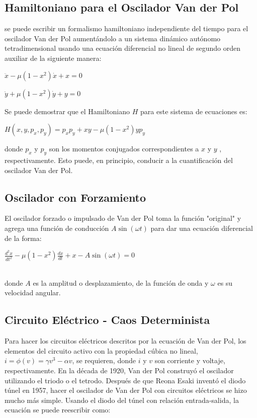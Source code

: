 \documentclass[12pt]{article}
\begin{document}
\subsection*{Hamiltoniano para el Oscilador Van der Pol}
se puede escribir un formalismo hamiltoniano independiente del tiempo para el oscilador Van der Pol aumentándolo a un sistema dinámico autónomo tetradimensional usando una ecuación diferencial no lineal de segundo orden auxiliar de la siguiente manera:\\
\centerline{$\displaystyle \ddot x - \mu (1-x^2)\dot x+x=0 $}
\centerline{$\displaystyle \ddot y + \mu (1-x^2)\dot y+y=0 $}
Se puede demostrar que el Hamiltoniano $H$ para este sistema de ecuaciones es:\\
\centerline{$ H(x,y,p_x,p_y) = p_x p_y +xy -\mu (1-x^2)yp_y$}
donde $p_x$ y $p_y$ son los momentos conjugados correspondientes a $x$ y $y$ , respectivamente. Esto puede, en principio, conducir a la cuantificación del oscilador Van der Pol.

\subsection*{Oscilador con Forzamiento}
El oscilador forzado o impulsado de Van der Pol toma la función "original" y agrega una función de conducción $A \sin ( \omega t )$ para dar una ecuación diferencial de la forma:\\

\centerline{$\displaystyle \frac{d^2x}{dt^2} - \mu (1-x^2) \frac{dx}{dt} +x-A \sin ( \omega t )  = 0$}
$ $\\
donde $A$ es la amplitud  o desplazamiento, de la función de onda y $\omega$ es su velocidad angular.

\subsection*{Circuito Eléctrico - Caos Determinista}
Para hacer los circuitos eléctricos descritos por la ecuación de Van der Pol, los elementos del circuito activo con la propiedad cúbica no lineal, $i = \phi(v)=\gamma v^3-\alpha v$, se requieren, donde $i$ y $v$ son corriente y voltaje, respectivamente. En la década de 1920, Van der Pol construyó el oscilador utilizando el triodo o el tetrodo. Después de que Reona Esaki inventó el diodo túnel en 1957, hacer el oscilador de Van der Pol con circuitos eléctricos se hizo mucho más simple.
Usando el diodo del túnel con relación entrada-salida, la ecuación se puede reescribir como:\\
\end{document}
